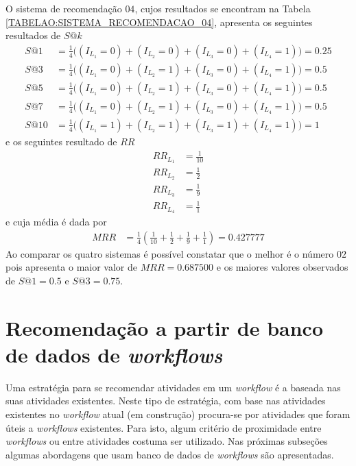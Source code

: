 O sistema de recomendação \(04\), cujos resultados se encontram na Tabela \ref{TABELAO:SISTEMA_RECOMENDACAO_04}, apresenta os seguintes resultados de \(S@k\)
\begin{align}
S@1 &= \frac{1}{4}  \Big( (I_{L_{1}} = 0) + (I_{L_{2}} = 0) + (I_{L_{3}} = 0) + (I_{L_{4}} = 1) \Big)  	 =	0.25 \\
S@3 &= \frac{1}{4}  \Big( (I_{L_{1}} = 0) + (I_{L_{2}} = 1) + (I_{L_{3}} = 0) + (I_{L_{4}} = 1) \Big)	 =	0.5	 \\
S@5 &= \frac{1}{4}  \Big( (I_{L_{1}} = 0) + (I_{L_{2}} = 1) + (I_{L_{3}} = 0) + (I_{L_{4}} = 1) \Big)	 =	0.5	 \\
S@7 &= \frac{1}{4}  \Big( (I_{L_{1}} = 0) + (I_{L_{2}} = 1) + (I_{L_{3}} = 0) + (I_{L_{4}} = 1) \Big)	 =	0.5	 \\
S@10 &= \frac{1}{4} \Big( (I_{L_{1}} = 1) + (I_{L_{2}} = 1) + (I_{L_{3}} = 1) + (I_{L_{4}} = 1) \Big) 	 =	1		
\end{align}
e os seguintes resultado de \(RR\)
\begin{align}
RR_{L_{1}} &= \frac{1}{10}		\\
RR_{L_{2}} &= \frac{1}{2}		\\
RR_{L_{3}} &= \frac{1}{9}		\\
RR_{L_{4}} &= \frac{1}{1}		
\end{align}
e cuja média é dada por 
\begin{align}
MRR &= \frac{1}{4} \left( \frac{1}{10} + \frac{1}{2} + \frac{1}{9} + \frac{1}{1} \right) = 0.427777
\end{align}
Ao comparar os quatro sistemas é possível constatar que o melhor é o número \(02\) pois apresenta o maior valor de \(MRR = 0.687500\) e os maiores valores observados de \(S@1 = 0.5\) e \(S@3 = 0.75\).

\section{Recomendação a partir de banco de dados de \emph{workflows}}\label{SEC_RECOMENDACAO_BASE_WORKFLOWS}
Uma estratégia para se recomendar atividades em um \emph{workflow} é a baseada nas suas atividades existentes. Neste tipo de estratégia, com base nas atividades existentes no \emph{workflow} atual (em construção) procura-se por atividades que foram úteis a \emph{workflows} existentes. Para isto, algum critério de proximidade entre \emph{workflows} ou entre atividades costuma ser utilizado. Nas próximas subseções algumas abordagens que usam banco de dados de \emph{workflows} são apresentadas.

